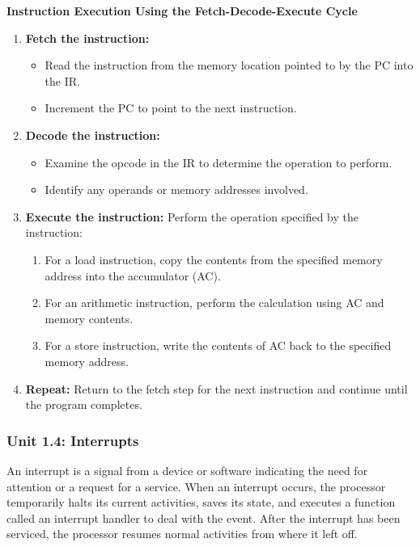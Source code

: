 \documentclass{article}
\begin{document}
\begin{methodbox}
\textbf{Instruction Execution Using the Fetch-Decode-Execute Cycle}

\begin{enumerate}
    \item \textbf{Fetch the instruction:}
    \begin{itemize}
        \item Read the instruction from the memory location pointed to by the PC into the IR.
        \item Increment the PC to point to the next instruction.
    \end{itemize} 
         
    \item \textbf{Decode the instruction:} 
    \begin{itemize}
        \item Examine the opcode in the IR to determine the operation to perform.
        \item Identify any operands or memory addresses involved.
    \end{itemize}  
    
    \item \textbf{Execute the instruction:} Perform the operation specified by the instruction:
    \begin{enumerate}
        \item For a load instruction, copy the contents from the specified memory address into the accumulator (AC).
        \item For an arithmetic instruction, perform the calculation using AC and memory contents.
        \item For a store instruction, write the contents of AC back to the specified memory address.
    \end{enumerate}
    
    \item \textbf{Repeat:} Return to the fetch step for the next instruction and continue until the program completes.
\end{enumerate}
\end{methodbox}

\subsubsection*{Unit 1.4: Interrupts}
{}
An interrupt is a signal from a device or software indicating the need for attention or a request for a service. 
When an interrupt occurs, the processor temporarily halts its current activities, saves its state, and executes a function called an interrupt handler to deal with the event.
After the interrupt has been serviced, the processor resumes normal activities from where it left off.
\end{document}
